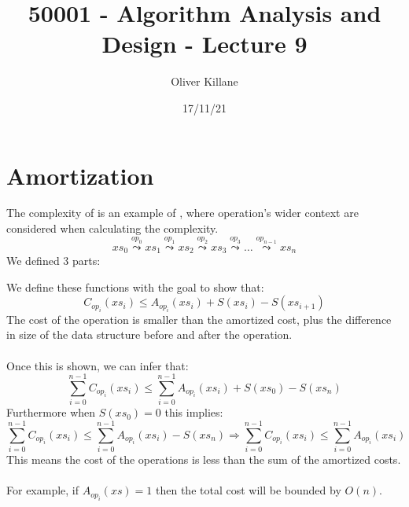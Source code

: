 \documentclass{report}
\title{50001 - Algorithm Analysis and Design - Lecture 9}
\author{Oliver Killane}
\date{17/11/21}
\begin{document}
    \maketitle
    \section*{Amortization}
        The complexity of  is an example of , where operation's wider context are considered when calculating the complexity.
        \[xs_0 \overset{op_0}{\leadsto} xs_1 \overset{op_1}{\leadsto} xs_2 \overset{op_2}{\leadsto} xs_3 \overset{op_3}{\leadsto} \dots \overset{op_{n-1}}{\leadsto} xs_n\]
        We defined 3 parts:
        \begin{enumerate}
        \end{enumerate}
        We define these functions with the goal to show that:
        \[C_{op_i}(xs_i) \leq A_{op_i} (xs_i) + S(xs_i) - S(xs_{i+1})\]
        The cost of the operation is smaller than the amortized cost, plus the difference in size of the data structure before and after the operation.
        \\
        \\ Once this is shown, we can infer that:
        \[\sum^{n-1}_{i=0}C_{op_i}(xs_i) \leq \sum^{n-1}_{i=0}A_{op_i}(xs_i) + S(xs_0) - S(xs_n)\]
        Furthermore when $S(xs_0) = 0$ this implies:
        \[\sum^{n-1}_{i=0}C_{op_i}(xs_i) \leq \sum^{n-1}_{i=0}A_{op_i}(xs_i) - S(xs_n) \Rightarrow \sum^{n-1}_{i=0}C_{op_i}(xs_i) \leq \sum^{n-1}_{i=0}A_{op_i}(xs_i)\]
        This means the cost of the operations is less than the sum of the amortized costs.
        \\
        \\ For example, if $A_{op_i}(xs) = 1$ then the total cost will be bounded by $O(n)$.
        
\end{document}
